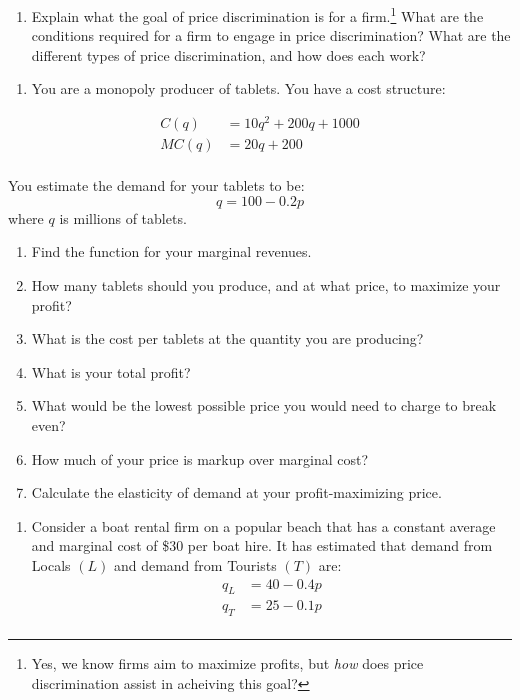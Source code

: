 \documentclass[]{article}
\providecommand{\tightlist}{%
  \setlength{\itemsep}{0pt}\setlength{\parskip}{0pt}}
\let\rmarkdownfootnote\footnote%
\def\footnote{\protect\rmarkdownfootnote}
\begin{document}
\clearpage

\begin{enumerate}
\def\labelenumi{\arabic{enumi}.}
\setcounter{enumi}{4}
\tightlist
\item
  Explain what the goal of price discrimination is for a firm.\footnote{Yes,
    we know firms aim to maximize profits, but \emph{how} does price
    discrimination assist in acheiving this goal?} What are the
  conditions required for a firm to engage in price discrimination? What
  are the different types of price discrimination, and how does each
  work?
\end{enumerate}

\clearpage

\begin{enumerate}
\def\labelenumi{\arabic{enumi}.}
\setcounter{enumi}{5}
\tightlist
\item
  You are a monopoly producer of tablets. You have a cost structure:
\end{enumerate}

\[\begin{aligned}
C(q)&=10q^2+200q+1000\\
MC(q)&=20q+200\\
\end{aligned}\]

You estimate the demand for your tablets to be: \[q=100-0.2p\] where
\(q\) is millions of tablets.

\begin{enumerate}
\def\labelenumi{\alph{enumi}.}
\tightlist
\item
  Find the function for your marginal revenues.
\item
  How many tablets should you produce, and at what price, to maximize
  your profit?
\item
  What is the cost per tablets at the quantity you are producing?
\item
  What is your total profit?
\item
  What would be the lowest possible price you would need to charge to
  break even?
\item
  How much of your price is markup over marginal cost?
\item
  Calculate the elasticity of demand at your profit-maximizing price.
\end{enumerate}

\clearpage

\begin{enumerate}
\def\labelenumi{\arabic{enumi}.}
\setcounter{enumi}{6}
\tightlist
\item
  Consider a boat rental firm on a popular beach that has a constant
  average and marginal cost of \$30 per boat hire. It has estimated that
  demand from Locals \((L)\) and demand from Tourists \((T)\) are:
  \[\begin{aligned}
  q_L&=40-0.4p\\
  q_T&=25-0.1p\\
  \end{aligned}\]
\end{enumerate}
\end{document}
